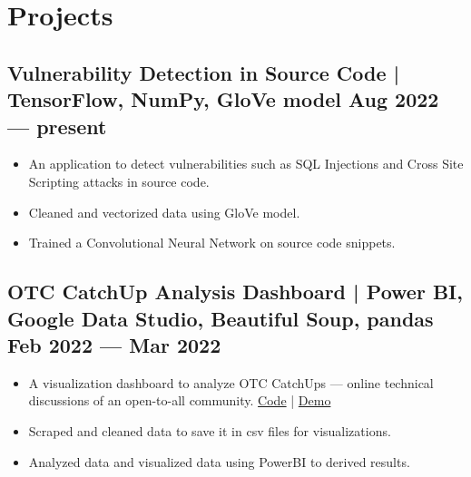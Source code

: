 \documentclass[10pt]{article}
\newenvironment{zitemize}{
\begin{itemize}\itemsep2pt \parskip0pt \parsep1pt}
{\end{itemize}\vspace{-0.7cm}}
\begin{document}
\section{Projects} %
\vspace{2pt}



\subsection*{Vulnerability Detection in Source Code | \normalfont{} \normalsize TensorFlow, NumPy, GloVe model \hfill \textbf{Aug 2022 --- present}}
    \begin{zitemize}
    \item An application to detect vulnerabilities such as SQL Injections and Cross Site Scripting attacks in source code.
     \item Cleaned and vectorized data using GloVe model.
        \item Trained a Convolutional Neural Network on source code snippets.
       
    \end{zitemize}
    \vspace{0.1cm}
\subsection*{OTC CatchUp Analysis Dashboard | \normalfont{} \normalsize Power BI, Google Data Studio, Beautiful Soup, pandas \hfill 
\textbf{Feb 2022 --- Mar 2022}}
    \begin{zitemize}
    \item A visualization dashboard to analyze OTC CatchUps --- online technical discussions of an open-to-all community. \hfill \href{https://github.com/mihikagaonkar/OTC-Dashboard/}{Code}
| \href{https://mihikagaonkar.github.io/OTC-Dashboard/data_studio}{Demo}
     \item Scraped and cleaned data to save it in csv files for visualizations.
        \item Analyzed data and visualized data using PowerBI to derived results.
       
    \end{zitemize}
        \vspace{0.1cm}
\end{document}
